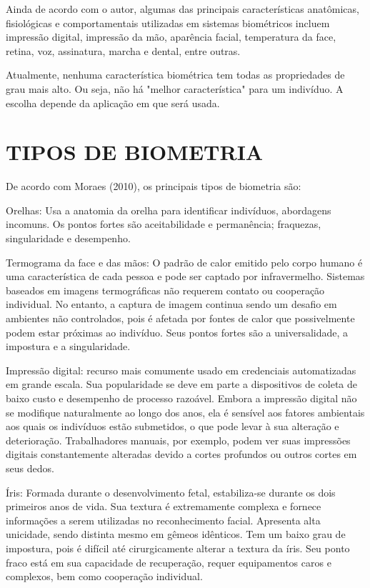 Ainda de acordo com o autor, algumas das principais características anatômicas, 
fisiológicas e comportamentais utilizadas em sistemas biométricos incluem impressão digital, 
impressão da mão, aparência facial, temperatura da face, retina, voz, assinatura, marcha e dental, 
entre outras.

Atualmente, nenhuma característica biométrica tem todas as propriedades de grau mais 
alto. Ou seja, não há "melhor característica" para um indivíduo. A escolha depende da aplicação 
em que será usada.

\section{TIPOS DE BIOMETRIA}\label{sec:formatacaoTexto}

De acordo com Moraes (2010), os principais tipos de biometria são:

Orelhas: Usa a anatomia da orelha para identificar indivíduos, abordagens incomuns. Os pontos fortes são aceitabilidade e permanência; fraquezas, singularidade e desempenho.

Termograma da face e das mãos: O padrão de calor emitido pelo corpo humano é uma característica de cada pessoa e pode ser captado por infravermelho. Sistemas baseados em imagens termográficas não requerem contato ou cooperação individual. No entanto, a captura de imagem continua sendo um desafio em ambientes não controlados, pois é afetada por fontes de calor que possivelmente podem estar próximas ao indivíduo. Seus pontos fortes são a universalidade, a impostura e a singularidade.

Impressão digital: recurso mais comumente usado em credenciais automatizadas em grande escala. Sua popularidade se deve em parte a dispositivos de coleta de baixo custo e desempenho de processo razoável. Embora a impressão digital não se modifique naturalmente ao longo dos anos, ela é sensível aos fatores ambientais aos quais os indivíduos estão submetidos, o que pode levar à sua alteração e deterioração. Trabalhadores manuais, por exemplo, podem ver suas impressões digitais constantemente alteradas devido a cortes profundos ou outros cortes em seus dedos.

Íris: Formada durante o desenvolvimento fetal, estabiliza-se durante os dois primeiros anos de vida. Sua textura é extremamente complexa e fornece informações a serem utilizadas no reconhecimento facial. Apresenta alta unicidade, sendo distinta mesmo em gêmeos idênticos. Tem um baixo grau de impostura, pois é difícil até cirurgicamente alterar a textura da íris. Seu ponto fraco está em sua capacidade de recuperação, requer equipamentos caros e complexos, bem como cooperação individual.


